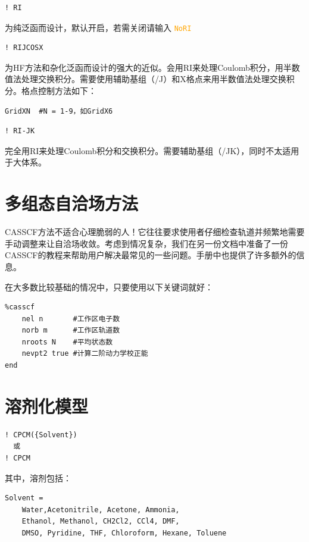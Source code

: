 \documentclass{ctexart}
\newcommand{\cmd}[1]{\textcolor{orange}{ \texttt{#1} }}
\begin{document}
	\begin{lstlisting}
! RI
	\end{lstlisting}
	
	为纯泛函而设计，默认开启，若需关闭请输入\cmd{NoRI}
	
	\begin{lstlisting}
! RIJCOSX
	\end{lstlisting}
	
	为HF方法和杂化泛函而设计的强大的近似。会用RI来处理Coulomb积分，用半数值法处理交换积分。需要使用辅助基组（/J）和X格点来用半数值法处理交换积分。格点控制方法如下：
	\begin{lstlisting}
GridXN  #N = 1-9，如GridX6
	\end{lstlisting}
	
	\begin{lstlisting}
! RI-JK
	\end{lstlisting}
	
	完全用RI来处理Coulomb积分和交换积分。需要辅助基组（/JK），同时不太适用于大体系。
	
	\section{多组态自洽场方法} 
	
	CASSCF方法不适合心理脆弱的人！它往往要求使用者仔细检查轨道并频繁地需要手动调整来让自洽场收敛。考虑到情况复杂，我们在另一份文档中准备了一份CASSCF的教程来帮助用户解决最常见的一些问题。手册中也提供了许多额外的信息。
	
	在大多数比较基础的情况中，只要使用以下关键词就好：
	
	\begin{lstlisting}
%casscf 
	nel n		#工作区电子数
	norb m		#工作区轨道数
	nroots N	#平均状态数
	nevpt2 true	#计算二阶动力学校正能
end
	\end{lstlisting}
	
	\section{溶剂化模型} 
	\begin{lstlisting}
! CPCM({Solvent})
  或
! CPCM
	\end{lstlisting}
	
	其中，溶剂包括：
	\begin{lstlisting}
Solvent = 
	Water,Acetonitrile, Acetone, Ammonia, 
	Ethanol, Methanol, CH2Cl2, CCl4, DMF, 
	DMSO, Pyridine, THF, Chloroform, Hexane, Toluene
	\end{lstlisting}
	
\end{document}
